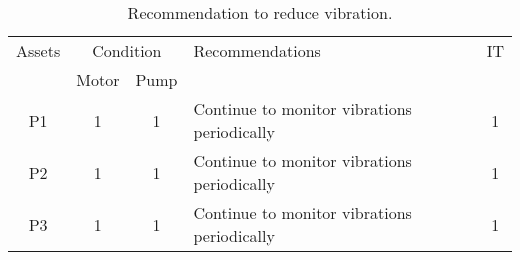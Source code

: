 \begin{table}[!h]
	\caption{Recommendation to reduce vibration.}
	\label{ch045_tbl_vibration_recommendation}
	{\footnotesize
\begin{tabular}{l|l|l|p{8cm}|c}

\hline
\multicolumn{1}{c|}{Assets} & \multicolumn{2}{c|}{Condition} & Recommendations & IT \\ 
\cline{2-3}
\multicolumn{1}{c|}{} & \multicolumn{1}{c|}{Motor} & \multicolumn{1}{c|}{Pump} & \multicolumn{1}{c|}{} &  \\ 
\hline
\multicolumn{1}{c|}{P1} & \multicolumn{1}{c|}{1} & \multicolumn{1}{c|}{1} & Continue to monitor vibrations periodically & 1 \\ 
\multicolumn{1}{c|}{P2} & \multicolumn{1}{c|}{1} & \multicolumn{1}{c|}{1} & Continue to monitor vibrations periodically & 1 \\ 
\multicolumn{1}{c|}{P3} & \multicolumn{1}{c|}{1} & \multicolumn{1}{c|}{1} & Continue to monitor vibrations periodically & 1 \\ 
\hline

\end{tabular}
	}
\end{table}